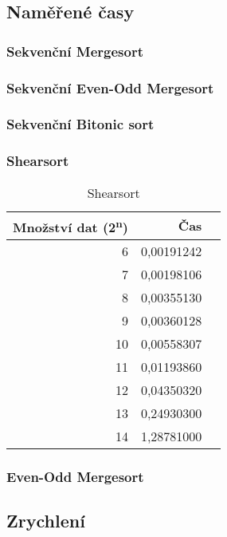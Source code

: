 \documentclass[12pt]{article}
\begin{document}
\subsection{Naměřené časy}

\subsubsection{Sekvenční Mergesort}

\subsubsection{Sekvenční Even-Odd Mergesort}


\subsubsection{Sekvenční Bitonic sort}

\subsubsection{Shearsort}
\begin{table}[H]
\begin{center}
\begin{tabular}{|r|r|r|}
\hline Množství dat (2\textsuperscript{n}) & Čas \\ \hline
6 &  0,00191242 \\ \hline
7 &  0,00198106 \\ \hline
8 &  0,00355130 \\ \hline
9 &  0,00360128 \\ \hline
10 & 0,00558307 \\ \hline
11 & 0,01193860 \\ \hline
12 & 0,04350320 \\ \hline
13 & 0,24930300 \\ \hline
14 & 1,28781000 \\ \hline
\end{tabular} 
\end{center}
\caption{Shearsort}
\end{table}

\subsubsection{Even-Odd Mergesort}

\subsection{Zrychlení}
\end{document}
